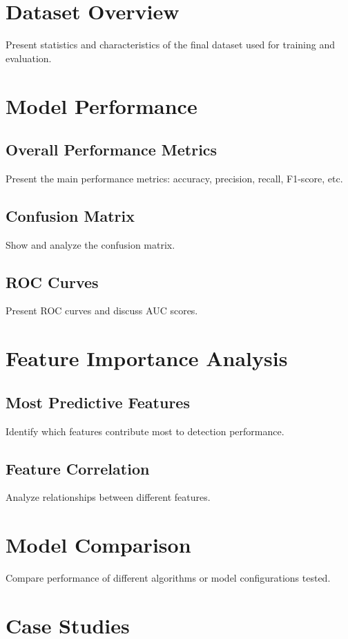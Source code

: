 
\section{Dataset Overview}
Present statistics and characteristics of the final dataset used for training and evaluation.

\section{Model Performance}
\subsection{Overall Performance Metrics}
Present the main performance metrics: accuracy, precision, recall, F1-score, etc.

\subsection{Confusion Matrix}
Show and analyze the confusion matrix.

\subsection{ROC Curves}
Present ROC curves and discuss AUC scores.

\section{Feature Importance Analysis}
\subsection{Most Predictive Features}
Identify which features contribute most to detection performance.

\subsection{Feature Correlation}
Analyze relationships between different features.

\section{Model Comparison}
Compare performance of different algorithms or model configurations tested.

\section{Case Studies}
